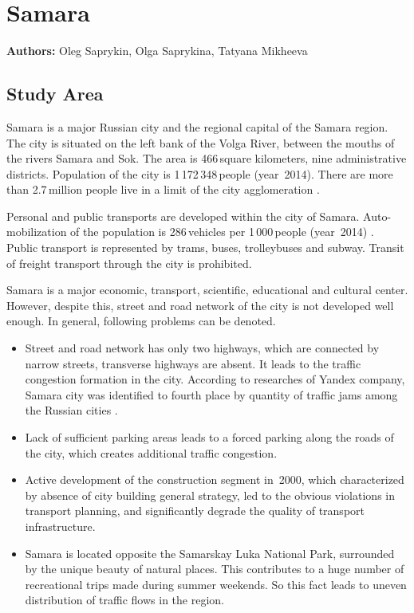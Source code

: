 \chapter{Samara}
\label{ch:samara}
\hfill \textbf{Authors:} Oleg Saprykin, Olga Saprykina, Tatyana Mikheeva

\section{Study Area}
Samara is a major Russian city and the regional capital of the Samara region. The city is situated on the left bank of the Volga River, between the mouths of the rivers Samara and Sok. The area is 466\,square kilometers, nine administrative districts. Population of the city is 1\,172\,348\,people (year~2014). There are more than 2.7\,million people live in a limit of the city agglomeration \citep[][]{GKS_2010}.

Personal and public transports are developed within the city of Samara. Auto-mobilization of the population is 286\,vehicles per 1\,000\,people (year~2014) \citep[][]{Gradoteka_2015}. Public transport is represented by trams, buses, trolleybuses and subway. Transit of freight transport through the city is prohibited.

Samara is a major economic, transport, scientific, educational and cultural center. However, despite this, street and road network of the city is not developed well enough. In general, following problems can be denoted.

\begin{itemize}
\item Street and road network has only two highways, which are connected by narrow streets, transverse highways are absent. It leads to the traffic congestion formation in the city. According to researches of Yandex company, Samara city was identified to fourth place by quantity of traffic jams among the Russian cities \citep[][]{Yandex_2013}.
\item Lack of sufficient parking areas leads to a forced parking along the roads of the city, which creates additional traffic congestion.
\item Active development of the construction segment in~2000, which characterized by absence of city building general strategy, led to the obvious violations in transport planning, and significantly degrade the quality of transport infrastructure.
\item Samara is located opposite the Samarskay Luka National Park, surrounded by the unique beauty of natural places. This contributes to a huge number of recreational trips made during summer weekends. So this fact leads to uneven distribution of traffic flows in the region.
\end{itemize}


